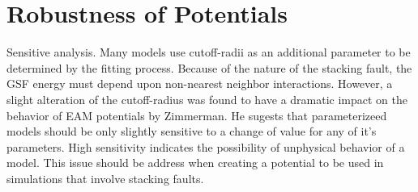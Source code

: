 \section{Robustness of Potentials}
Sensitive analysis.  Many models use cutoff-radii as an additional parameter to be determined by the fitting process.  Because of the nature of the stacking fault, the GSF energy must depend upon non-nearest neighbor interactions.
However, a slight alteration of the cutoff-radius was found to have a dramatic impact on the behavior of EAM potentials by Zimmerman.%
He sugests that parameterizeed models should be only slightly sensitive to a change of value for any of it's parameters.  High sensitivity indicates the possibility of unphysical behavior of a model.  This issue should be address when creating a potential to be used in simulations that involve stacking faults.
